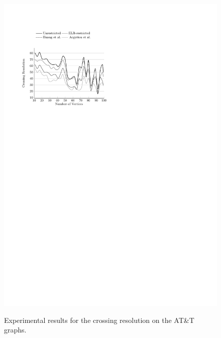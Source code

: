 \documentclass{comjnl}
\begin{document}
\begin{figure}[t!]
{	\includegraphics[scale=0.99,page=4]{figures/north}}
	\caption{Experimental results for the crossing resolution on the AT\&T graphs.}
	\label{fig:northCrossing}
\end{figure}
\end{document}
